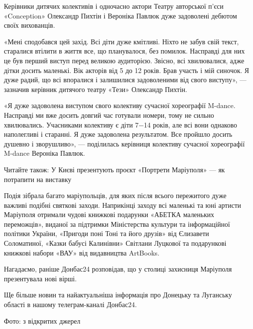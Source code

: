 Керівники дитячих колективів і одночасно актори Театру авторської п'єси
«Conception» Олександр Пихтін і Вероніка Павлюк дуже задоволені дебютом своїх
вихованців.

«Мені сподобався цей захід. Всі діти дуже кмітливі. Ніхто не забув свій текст,
старалися втілити в життя все, що планувалося, без помилок. Насправді для них
це був перший виступ перед великою аудиторією. Звісно, всі хвилювалися, адже
дітки досить маленькі. Вік акторів від 5 до 12 років. Брав участь і мій
синочок. Я дуже радий, що всі впоралися і залишилися задоволеними від свого
виступу», — зазначив керівник дитячого театру «Тези» Олександр Пихтін.

«Я дуже задоволена виступом свого колективу сучасної хореографії M-dance.
Насправді ми вже досить довгий час готували номери, тому не сильно хвилювались.
Учасниками колективу є діти 7−14 років, але всі вони однаково наполегливі і
старанні. Я дуже задоволена результатом. Все пройшло досить душевно і
зворушливо», — поділилась керівниця колективу сучасної хореографії M-dance
Вероніка Павлюк. 

Читайте також: У Києві презентують проєкт «Портрети Маріуполя» — як потрапити на виставку

Подія зібрала багато маріупольців, для яких після всього пережитого дуже
важливі подібні святкові заходи. Наприкінці заходу всі маленькі та юні артисти
Маріуполя отримали чудові книжкові подарунки «АБЕТКА маленьких переможців»,
виданої за підтримки Міністерства культури та інформаційної політики України,
«Пригоди поні Тоні та його друзів» від Єлизавети Соломатиної, «Казки бабусі
Калинівни» Світлани Луцкової та подарункові книжкові набори «ВАУ» від
видавництва ArtBooks.

Нагадаємо, раніше Донбас24 розповідав, що у столиці захисниця Маріуполя
презентувала нові вірші.

Ще більше новин та найактуальніша інформація про Донецьку та Луганську області
в нашому телеграм-каналі Донбас24.

Фото: з відкритих джерел
